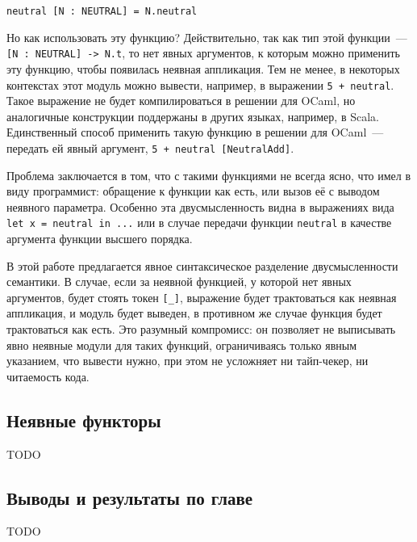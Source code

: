 \documentclass[../diploma.tex]{subfiles}
\begin{document}
\begin{verbatim}
neutral [N : NEUTRAL] = N.neutral
\end{verbatim}

Но как использовать эту функцию? Действительно, так как тип этой функции~--- \texttt{[N : NEUTRAL] -> N.t}, то нет явных аргументов, к которым можно применить эту функцию, чтобы появилась неявная аппликация. Тем не менее, в некоторых контекстах этот модуль можно вывести, например, в выражении \texttt{5 + neutral}. Такое выражение не будет компилироваться в решении для OCaml, но аналогичные конструкции поддержаны в других языках, например, в Scala. Единственный способ применить такую функцию в решении для OCaml~--- передать ей явный аргумент, \texttt{5 + neutral [NeutralAdd]}.

Проблема заключается в том, что с такими функциями не всегда ясно, что имел в виду программист: обращение к функции как есть, или вызов её с выводом неявного параметра. Особенно эта двусмысленность видна в выражениях вида \texttt{let x = neutral in ...} или в случае передачи функции \texttt{neutral} в качестве аргумента функции высшего порядка. 

В этой работе предлагается явное синтаксическое разделение двусмысленности семантики. В случае, если за неявной функцией, у которой нет явных аргументов, будет стоять токен \texttt{[\_]}, выражение будет трактоваться как неявная аппликация, и модуль будет выведен, в противном же случае функция будет трактоваться как есть. Это разумный компромисс: он позволяет не выписывать явно неявные модули для таких функций, ограничиваясь только явным указанием, что вывести нужно, при этом не усложняет ни тайп-чекер, ни читаемость кода.

\subsection{Неявные функторы}

TODO

\subsection{Выводы и результаты по главе}

TODO
\end{document}
